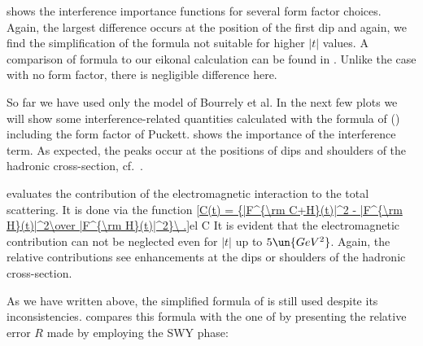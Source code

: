  shows the interference importance functions for several form factor choices. Again, the largest difference occurs at the position of the first dip and again, we find the simplification of the \WaY{} formula not suitable for higher $|t|$ values. A comparison of \KL{} formula to our eikonal calculation can be found in . Unlike the case with no form factor, there is negligible difference here.






So far we have used only the model of Bourrely et al. In the next few plots we will show some interference-related quantities calculated with the formula of \KaL{} () including the form factor of Puckett.  shows the importance of the interference term. As expected, the peaks occur at the positions of dips and shoulders of the hadronic cross-section, cf.~.


 evaluates the contribution of the electromagnetic interaction to the total scattering. It is done via the function
\eqref{C(t) = {|F^{\rm C+H}(t)|^2 - |F^{\rm H}(t)|^2\over |F^{\rm H}(t)|^2}\ .}{el C}
It is evident that the electromagnetic contribution can not be neglected even for $|t|$ up to $5\un{GeV^2}$. Again, the relative contributions see enhancements at the dips or shoulders of the hadronic cross-section.


As we have written above, the simplified formula of \WaY{} is still used despite its inconsistencies.  compares this formula with the one of \KaL{} by presenting the relative error $R$ made by employing the SWY phase:

